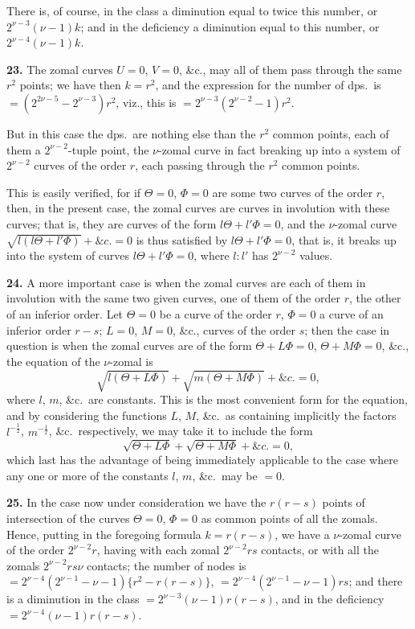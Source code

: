 \documentclass[11pt,a4paper]{article}
\theoremstyle{definition}
\begin{document}
There is, of course, in the class a diminution equal to twice this number, or $2^{\nu-3}(\nu-1)k$; and in the deficiency a diminution equal to this number, or $2^{\nu-4}(\nu-1)k$.

\noindent\textbf{23.} The zomal curves $U=0$, $V=0$, \&c., may all of them pass through the same $r^2$ points; we have then $k=r^2$, and the expression for the number of dps.\ is $=(2^{2\nu-5}-2^{\nu-3})r^2$, viz., this is $=2^{\nu-3}(2^{\nu-2}-1)r^2$.

But in this case the dps.\ are nothing else than the $r^2$ common points, each of them a $2^{\nu-2}$-tuple point, the $\nu$-zomal curve in fact breaking up into a system of $2^{\nu-2}$ curves of the order $r$, each passing through the $r^2$ common points.

This is easily verified, for if $\Theta=0$, $\Phi=0$ are some two curves of the order $r$, then, in the present case, the zomal curves are curves in involution with these curves; that is, they are curves of the form $l\Theta+l'\Phi=0$, and the $\nu$-zomal curve $\sqrt{l(l\Theta+l'\Phi)}+\&c.=0$ is thus satisfied by $l\Theta+l'\Phi=0$, that is, it breaks up into the system of curves $l\Theta+l'\Phi=0$, where $l:l'$ has $2^{\nu-2}$ values.

\setcounter{page}{481}

\noindent\textbf{24.} A more important case is when the zomal curves are each of them in involution with the same two given curves, one of them of the order $r$, the other of an inferior order. Let $\Theta=0$ be a curve of the order $r$, $\Phi=0$ a curve of an inferior order $r-s$; $L=0$, $M=0$, \&c., curves of the order $s$; then the case in question is when the zomal curves are of the form $\Theta+L\Phi=0$, $\Theta+M\Phi=0$, \&c., the equation of the $\nu$-zomal is
\[
\sqrt{l(\Theta+L\Phi)}+\sqrt{m(\Theta+M\Phi)}+\&c.=0,
\]
where $l$, $m$, \&c.\ are constants. This is the most convenient form for the equation, and by considering the functions $L$, $M$, \&c.\ as containing implicitly the factors $l^{-\frac{1}{2}}$, $m^{-\frac{1}{2}}$, \&c.\ respectively, we may take it to include the form
\[
\sqrt{\Theta+L\Phi}+\sqrt{\Theta+M\Phi}+\&c.=0,
\]
which last has the advantage of being immediately applicable to the case where any one or more of the constants $l$, $m$, \&c.\ may be $=0$.

\noindent\textbf{25.} In the case now under consideration we have the $r(r-s)$ points of intersection of the curves $\Theta=0$, $\Phi=0$ as common points of all the zomals. Hence, putting in the foregoing formula $k=r(r-s)$, we have a $\nu$-zomal curve of the order $2^{\nu-2}r$, having with each zomal $2^{\nu-2}rs$ contacts, or with all the zomals $2^{\nu-2}rs\nu$ contacts; the number of nodes is $=2^{\nu-4}(2^{\nu-1}-\nu-1)\{r^2-r(r-s)\}$, $=2^{\nu-4}(2^{\nu-1}-\nu-1)rs$; and there is a diminution in the class $=2^{\nu-3}(\nu-1)r(r-s)$, and in the deficiency $=2^{\nu-4}(\nu-1)r(r-s)$.
\end{document}
